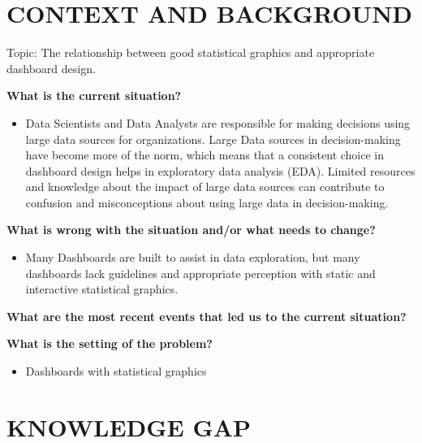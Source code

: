 \documentclass[print]{nuthesis}
\providecommand{\tightlist}{%
  \setlength{\itemsep}{0pt}\setlength{\parskip}{0pt}}
\begin{document}

\hypertarget{context-and-background}{%
\chapter{CONTEXT AND BACKGROUND}\label{context-and-background}}

Topic: The relationship between good statistical graphics and appropriate dashboard design.

\textbf{What is the current situation?}

\begin{itemize}
\tightlist
\item
  Data Scientists and Data Analysts are responsible for making decisions using large data sources for organizations. Large Data sources in decision-making have become more of the norm, which means that a consistent choice in dashboard design helps in exploratory data analysis (EDA). Limited resources and knowledge about the impact of large data sources can contribute to confusion and misconceptions about using large data in decision-making.
\end{itemize}

\textbf{What is wrong with the situation and/or what needs to change?}

\begin{itemize}
\tightlist
\item
  Many Dashboards are built to assist in data exploration, but many dashboards lack guidelines and appropriate perception with static and interactive statistical graphics.
\end{itemize}

\textbf{What are the most recent events that led us to the current situation?}

\textbf{What is the setting of the problem?}

\begin{itemize}
\tightlist
\item
  Dashboards with statistical graphics
\end{itemize}

\hypertarget{knowledge-gap}{%
\chapter{KNOWLEDGE GAP}\label{knowledge-gap}}
\end{document}
